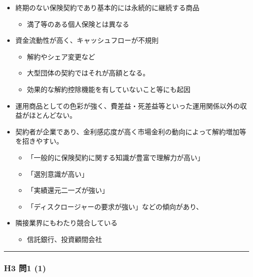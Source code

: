 \documentclass[
]{article}
\providecommand{\tightlist}{%
  \setlength{\itemsep}{0pt}\setlength{\parskip}{0pt}}
\begin{document}
\begin{itemize}
\tightlist
\item
  終期のない保険契約であり基本的には永続的に継続する商品

  \begin{itemize}
  \tightlist
  \item
    満了等のある個人保険とは異なる
  \end{itemize}
\item
  資金流動性が高く、キャッシュフローが不規則

  \begin{itemize}
  \tightlist
  \item
    解約やシェア変更など
  \item
    大型団体の契約ではそれが高額となる。
  \item
    効果的な解約控除機能を有していないこと等にも起因
  \end{itemize}
\item
  運用商品としての色彩が強く、費差益・死差益等といった運用関係以外の収益がほとんどない。
\item
  契約者が企業であり、金利感応度が高く市場金利の動向によって解約増加等を招きやすい。

  \begin{itemize}
  \tightlist
  \item
    「一般的に保険契約に関する知識が豊富で理解力が高い」
  \item
    「選別意識が高い」
  \item
    「実績還元二一ズが強い」
  \item
    「ディスクロージャーの要求が強い」などの傾向があり、
  \end{itemize}
\item
  隣接業界にもわたり競合している

  \begin{itemize}
  \tightlist
  \item
    信託銀行、投資顧間会社
  \end{itemize}
\end{itemize}

\begin{center}\rule{0.5\linewidth}{0.5pt}\end{center}

\hypertarget{h3-ux554f1-1}{%
\subsubsection{H3 問1 (1)}\label{h3-ux554f1-1}}
\end{document}
